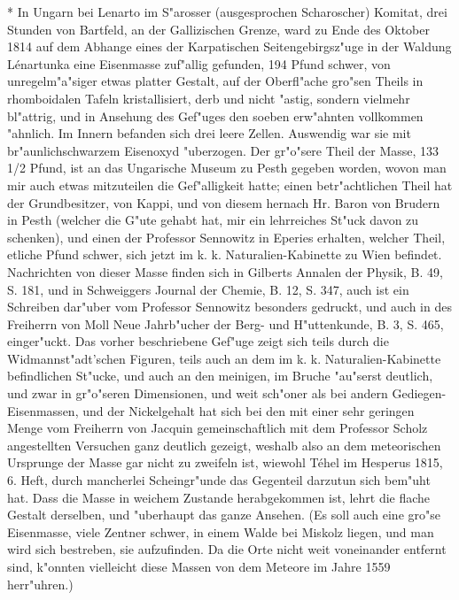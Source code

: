 \documentclass[a4paper, 11pt, oneside, polutonikogreek, german]{article}
\begin{document}
* In Ungarn bei Lenarto im S"arosser (ausgesprochen Scharoscher) Komitat, drei Stunden von Bartfeld, an der Gallizischen Grenze, ward zu Ende des Oktober 1814 auf dem Abhange eines der Karpatischen Seitengebirgsz"uge in der Waldung Lénartunka eine Eisenmasse zuf"allig gefunden, 194 Pfund schwer, von unregelm"a"siger etwas platter Gestalt, auf der Oberfl"ache gro"sen Theils in rhomboidalen Tafeln kristallisiert, derb und nicht "astig, sondern vielmehr bl"attrig, und in Ansehung des Gef"uges den soeben erw"ahnten vollkommen "ahnlich. Im Innern befanden sich drei leere Zellen. Auswendig war sie mit br"aunlichschwarzem Eisenoxyd "uberzogen. Der gr"o"sere Theil der Masse, 133 1/2 Pfund, ist an das Ungarische Museum zu Pesth gegeben worden, wovon man mir auch etwas mitzuteilen die Gef"alligkeit hatte; einen betr"achtlichen Theil hat der Grundbesitzer, von Kappi, und von diesem hernach Hr. Baron von Brudern in Pesth (welcher die G"ute gehabt hat, mir ein lehrreiches St"uck davon zu schenken), und einen der Professor Sennowitz in Eperies erhalten, welcher Theil, etliche Pfund schwer, sich jetzt im k. k. Naturalien-Kabinette zu Wien befindet. Nachrichten von dieser Masse finden sich in Gilberts Annalen der Physik, B. 49, S. 181, und in Schweiggers Journal der Chemie, B. 12, S. 347, auch ist ein Schreiben dar"uber vom Professor Sennowitz besonders gedruckt, und auch in des Freiherrn von Moll Neue Jahrb"ucher der Berg- und H"uttenkunde, B. 3, S. 465, einger"uckt. Das vorher beschriebene Gef"uge zeigt sich teils durch die Widmannst"adt'schen Figuren, teils auch an dem im k. k. Naturalien-Kabinette befindlichen St"ucke, und auch an den meinigen, im Bruche "au"serst deutlich, und zwar in gr"o"seren Dimensionen, und weit sch"oner als bei andern Gediegen-Eisenmassen, und der Nickelgehalt hat sich bei den mit einer sehr geringen Menge vom Freiherrn von Jacquin gemeinschaftlich mit dem Professor Scholz angestellten Versuchen ganz deutlich gezeigt, weshalb also an dem meteorischen Ursprunge der Masse gar nicht zu zweifeln ist, wiewohl Téhel im Hesperus 1815, 6. Heft, durch mancherlei Scheingr"unde das Gegenteil darzutun sich bem"uht hat. Dass die Masse in weichem Zustande herabgekommen ist, lehrt die flache Gestalt derselben, und "uberhaupt das ganze Ansehen. (Es soll auch eine gro"se Eisenmasse, viele Zentner schwer, in einem Walde bei Miskolz liegen, und man wird sich bestreben, sie aufzufinden. Da die Orte nicht weit voneinander entfernt sind, k"onnten vielleicht diese Massen von dem Meteore im Jahre 1559 herr"uhren.)
\end{document}
